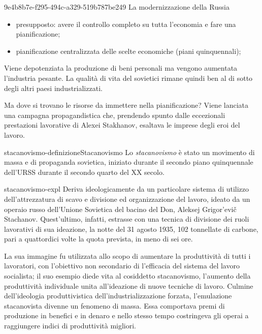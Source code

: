 \documentclass[preview]{standalone}
\begin{document}
\begin{snippet}{9e4b8b7e-f295-494c-a329-519b787be249}
    La modernizzazione della Russia
    \begin{itemize}
        \item presupposto: avere il controllo completo su tutta l'economia e fare una pianificazione;
        \item pianificazione centralizzata delle scelte economiche (piani quinquennali);
    \end{itemize}

    Viene depotenziata la produzione di beni personali ma vengono aumentata l'industria pesante.
    La qualità di vita del sovietici rimane quindi ben al di sotto degli altri paesi industrializzati.

    Ma dove si trovano le risorse da immettere nella pianificazione?
    Viene lanciata una campagna propagandistica che, prendendo spunto dalle eccezionali prestazioni
    lavorative di Alexei Stakhanov, esaltava le imprese degli eroi del lavoro.
\end{snippet}

\begin{snippetdefinition}{stacanovismo-definizione}{Stacanovismo}
    Lo \textit{stacanovismo} è stato un movimento di massa e di propaganda
    sovietica, iniziato durante il secondo piano quinquennale
    dell'URSS durante il secondo quarto del XX secolo. 
\end{snippetdefinition}

\begin{snippet}{stacanovismo-expl}
    Deriva ideologicamente da un particolare sistema di utilizzo
    dell'attrezzatura di scavo e divisione ed organizzazione del lavoro,
    ideato da un operaio russo dell'Unione Sovietica del bacino del Don,
    Aleksej Grigor'evič Stachanov.
    Quest'ultimo, infatti, estrasse con una tecnica di divisione dei
    ruoli lavorativi di sua ideazione, la notte del 31 agosto 1935,
    102 tonnellate di carbone, pari a quattordici volte la quota prevista,
    in meno di sei ore.

    La sua immagine fu utilizzata allo scopo di aumentare la produttività di
    tutti i lavoratori, con l'obiettivo non secondario di
     l'efficacia del sistema del lavoro socialista;
    il suo esempio diede vita al cosiddetto stacanovismo,
    l'aumento della produttività individuale unita all'ideazione
    di nuove tecniche di lavoro. Culmine dell'ideologia produttivistica
    dell'industrializzazione forzata, l'emulazione stacanovista divenne un
    fenomeno di massa. Essa comportava premi di produzione in benefici e
    in denaro e nello stesso tempo costringeva gli operai a raggiungere indici di
    produttività migliori.
\end{snippet}
\end{document}
